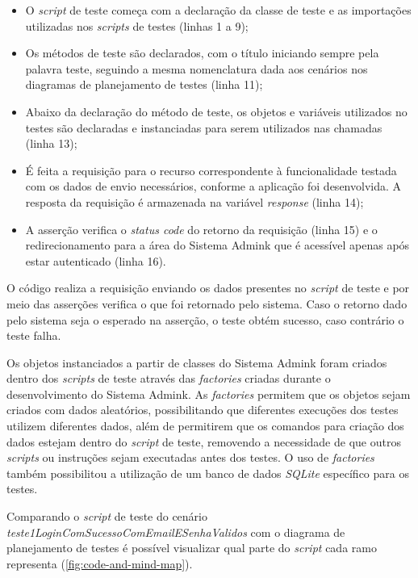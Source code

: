     \begin{itemize}
        \item O \emph{script} de teste começa com a declaração da classe de teste e as importações utilizadas nos \emph{scripts} de testes (linhas 1 a 9);
        \item Os métodos de teste são declarados, com o título iniciando sempre pela palavra teste, seguindo a mesma nomenclatura dada aos cenários nos diagramas de planejamento de testes (linha 11);
        \item Abaixo da declaração do método de teste, os objetos e variáveis utilizados no testes são declaradas e instanciadas para serem utilizados nas chamadas (linha 13);
        \item É feita a requisição para o recurso correspondente à funcionalidade testada com os dados de envio necessários, conforme a aplicação foi desenvolvida. A resposta da requisição é armazenada na variável \emph{response} (linha 14);
        \item A asserção verifica o \emph{status code} do retorno da requisição (linha 15) e o redirecionamento para a área do Sistema Admink que é acessível apenas após estar autenticado (linha 16).
    \end{itemize}
        
    
        
    O código realiza a requisição enviando os dados presentes no \emph{script} de teste e por meio das asserções verifica o que foi retornado pelo sistema. Caso o retorno dado pelo sistema seja o esperado na asserção, o teste obtém sucesso, caso contrário o teste falha.
        
    Os objetos instanciados a partir de classes do Sistema Admink foram criados dentro dos \emph{scripts} de teste através das \emph{factories} criadas durante o desenvolvimento do Sistema Admink. As \emph{factories} permitem que os objetos sejam criados com dados aleatórios, possibilitando que diferentes execuções dos testes utilizem diferentes dados, além de permitirem que os comandos para criação dos dados estejam dentro do \emph{script} de teste, removendo a necessidade de que outros \emph{scripts} ou instruções sejam executadas antes dos testes. O uso de \emph{factories} também possibilitou a utilização de um banco de dados \emph{SQLite} específico para os testes. %
        
    Comparando o \emph{script} de teste do cenário  \emph{teste1LoginComSucessoComEmailESenhaValidos} com o diagrama de planejamento de testes é possível visualizar qual parte do \emph{script} cada ramo representa (\autoref{fig:code-and-mind-map}).
        
